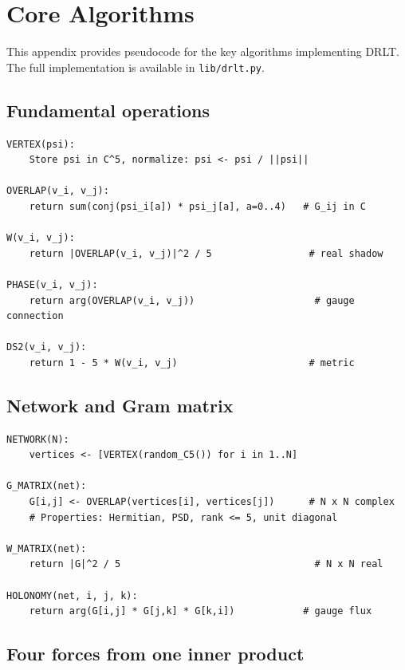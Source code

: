 \section{Core Algorithms}
\label{app:code}

This appendix provides pseudocode for the key algorithms implementing DRLT. The full implementation is available in \texttt{lib/drlt.py}.

\subsection{Fundamental operations}

\begin{verbatim}
VERTEX(psi):
    Store psi in C^5, normalize: psi <- psi / ||psi||

OVERLAP(v_i, v_j):
    return sum(conj(psi_i[a]) * psi_j[a], a=0..4)   # G_ij in C

W(v_i, v_j):
    return |OVERLAP(v_i, v_j)|^2 / 5                 # real shadow

PHASE(v_i, v_j):
    return arg(OVERLAP(v_i, v_j))                     # gauge connection

DS2(v_i, v_j):
    return 1 - 5 * W(v_i, v_j)                       # metric
\end{verbatim}

\subsection{Network and Gram matrix}

\begin{verbatim}
NETWORK(N):
    vertices <- [VERTEX(random_C5()) for i in 1..N]

G_MATRIX(net):
    G[i,j] <- OVERLAP(vertices[i], vertices[j])      # N x N complex
    # Properties: Hermitian, PSD, rank <= 5, unit diagonal

W_MATRIX(net):
    return |G|^2 / 5                                  # N x N real

HOLONOMY(net, i, j, k):
    return arg(G[i,j] * G[j,k] * G[k,i])            # gauge flux
\end{verbatim}

\subsection{Four forces from one inner product}


